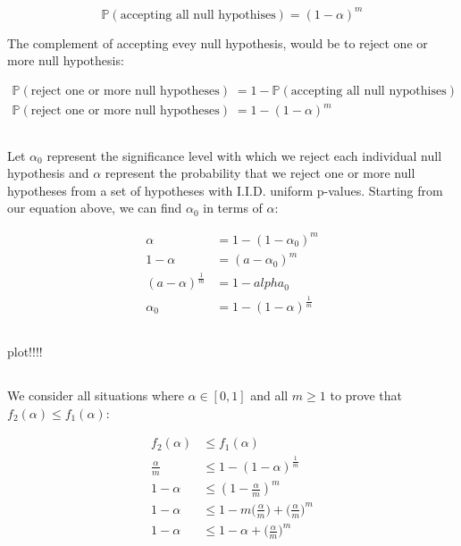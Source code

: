 \documentclass[a4paper,12pt]{article}
\begin{document}
$$
\mathbb{P}(\textrm{accepting all null hypothises}) = (1 - \alpha)^m
$$

The complement of accepting evey null hypothesis, would be to reject one or more null hypothesis:

\begin{align*}
\mathbb{P}(\textrm{reject one or more null hypotheses}) &= 1 - \mathbb{P}(\textrm{accepting all null nypothises}) \\
\mathbb{P}(\textrm{reject one or more null hypotheses}) &= 1 - (1 - \alpha)^m
\end{align*}


\subsection{}

Let $\alpha_0$ represent the significance level with which we reject each individual null hypothesis and $\alpha$ represent the probability that we reject one or more null hypotheses from a set of hypotheses with I.I.D. uniform p-values. Starting from our equation above, we can find $\alpha_0$ in terms of $\alpha$: 

\begin{align*}
\alpha &= 1 - (1 - \alpha_0)^m \\
1 - \alpha &= (a - \alpha_0)^m \\
(a - \alpha)^{\frac{1}{m}} &= 1 - alpha_0 \\
\alpha_0 &= 1 - (1 - \alpha)^{\frac{1}{m}}
\end{align*}

\subsection{}
plot!!!!

\subsection{}

We consider all situations where $\alpha \in [0,1]$ and all $m \geq 1$ to prove that $f_2(\alpha) \leq f_1(\alpha)$:

\begin{align*}
f_2(\alpha) &\leq f_1(\alpha) \\
\frac{\alpha}{m} &\leq 1 - (1 - \alpha)^{\frac{1}{m}} \\
1 - \alpha &\leq (1 - \frac{\alpha}{m})^m \\
1 - \alpha &\leq 1 - m\bigg( \frac{\alpha}{m} \bigg) + \bigg( \frac{\alpha}{m} \bigg)^m \\
1 - \alpha &\leq 1 - \alpha + \bigg( \frac{\alpha}{m} \bigg)^m 
\end{align*}
\end{document}
